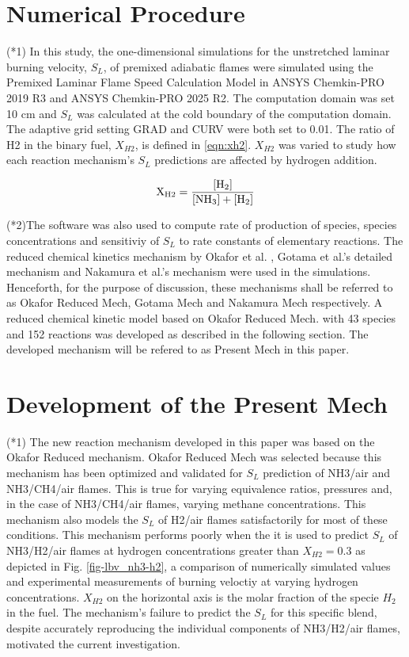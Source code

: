 \documentclass[10pt,twocolumn]{icfd2026paper}
\begin{document}
\section{Numerical Procedure}

(*1) In this study, the one-dimensional simulations for the unstretched laminar burning velocity, $S_L$, of premixed adiabatic flames were simulated using the Premixed Laminar Flame Speed Calculation Model in ANSYS Chemkin-PRO 2019 R3 and ANSYS Chemkin-PRO 2025 R2. The computation domain was set 10 cm and $S_L$ was calculated at the cold boundary of the computation domain. The adaptive grid setting GRAD and CURV were both set to 0.01. The ratio of H2 in the binary fuel, $X_{H2}$, is defined in \ref{eqn:xh2}. $X_{H2}$ was varied to study how each reaction mechanism's $S_L$ predictions are affected by hydrogen addition.

\begin{eqnarray}
	\text X_{\text H2}=\frac{[\text H_2]}{[\text{NH}_3]+[\text H_2]}
	\label{eqn:xh2}
\end{eqnarray}

(*2)The software was also used to compute rate of production of species, species concentrations and sensitiviy of $S_L$ to rate constants of elementary reactions. The reduced chemical kinetics mechanism by Okafor et al. \cite{okaforMeasurement2019}, Gotama et al.'s \cite{gotamaMeasurement2022} detailed mechanism and Nakamura et al.'s \cite{nakamuraKinetic2017} mechanism were used in the simulations. Henceforth, for the purpose of discussion, these mechanisms shall be referred to as Okafor Reduced Mech, Gotama Mech and Nakamura Mech respectively. A reduced chemical kinetic model based on Okafor Reduced Mech. \cite{okaforMeasurement2019} with 43 species and 152 reactions was developed as described in the following section. The developed mechanism will be refered to as Present Mech in this paper.
 
\section{Development of the Present Mech}

(*1) The new reaction mechanism developed in this paper was based on the Okafor Reduced mechanism. Okafor Reduced Mech was selected because this mechanism has been optimized and validated for $S_L$ prediction of NH3/air and NH3/CH4/air flames. This is true for varying equivalence ratios, pressures and, in the case of NH3/CH4/air flames, varying methane concentrations. This mechanism also models the $S_L$ of H2/air flames satisfactorily for most of these conditions. This mechanism performs poorly when the it is used to predict $S_L$ of NH3/H2/air flames at hydrogen concentrations greater than $X_{H2}=0.3$ as depicted in Fig. \ref{fig-lbv_nh3-h2}, a comparison of numerically simulated values and experimental measurements of burning veloctiy at varying hydrogen concentrations. $X_{H2}$ on the horizontal axis is the molar fraction of the specie $H_2$ in the fuel. The mechanism's failure to predict the $S_L$ for this specific blend, despite accurately reproducing the individual components of NH3/H2/air flames, motivated the current investigation.
\end{document}
